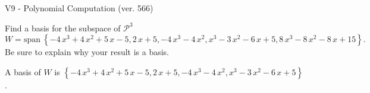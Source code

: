 \begin{exercise}
  \begin{exerciseTitle}V9 - Polynomial Computation (ver. 566)\end{exerciseTitle}
  \begin{exerciseStatement}
    Find a basis for the subspace of \(\mathcal{P}^3\) 
\[W=\mathrm{span}\ \left\{-4 \, x^{3} + 4 \, x^{2} + 5 \, x - 5 , 2 \, x + 5 , -4 \, x^{3} - 4 \, x^{2} , x^{3} - 3 \, x^{2} - 6 \, x + 5 , 8 \, x^{3} - 8 \, x^{2} - 8 \, x + 15\right\}.\]
 Be sure to explain why your result is a basis.


  \end{exerciseStatement}
  \begin{exerciseAnswer}
   A basis of \(W\) is  \(\left\{-4 \, x^{3} + 4 \, x^{2} + 5 \, x - 5 , 2 \, x + 5 , -4 \, x^{3} - 4 \, x^{2} , x^{3} - 3 \, x^{2} - 6 \, x + 5\right\}\).
  


  \end{exerciseAnswer}
\end{exercise}
